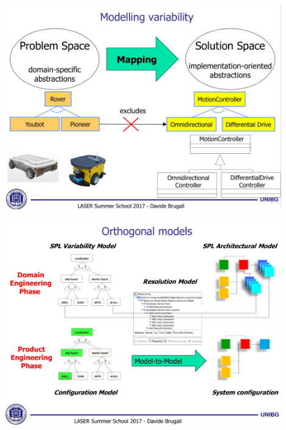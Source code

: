 \documentclass[xetex,mathserif,serif]{beamer}
\begin{document}
	\begin{frame}
		\begin{center}
			\includegraphics[width=0.9\textwidth]{brugali8.png}
		\end{center}
	\end{frame}

	\begin{frame}
		\begin{center}
			\includegraphics[width=0.9\textwidth]{brugali9.png}
		\end{center}
	\end{frame}
\end{document}
